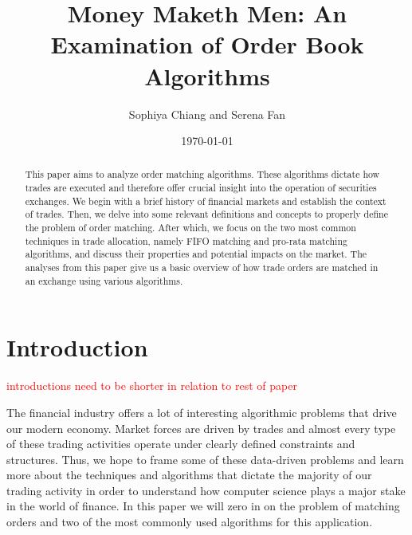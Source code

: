 \documentclass{article}
\newcommand{\todo}{\textcolor{red}}
\begin{document}
	
	\title{Money Maketh Men: An Examination of Order Book Algorithms}
	\author{Sophiya Chiang and Serena Fan}
	
\date{\today}

\maketitle

\begin{abstract}
This paper aims to analyze order matching algorithms. These algorithms dictate how trades are executed and therefore offer crucial insight into the operation of securities exchanges. We begin with a brief history of financial markets and establish the context of trades. Then, we delve into some relevant definitions and concepts to properly define the problem of order matching. After which, we focus on the two most common techniques in trade allocation, namely FIFO matching and pro-rata matching algorithms, and discuss their properties and potential impacts on the market. The analyses from this paper give us a basic overview of how trade orders are matched in an exchange using various algorithms.
\end{abstract}

\section{Introduction}
\todo{introductions need to be shorter in relation to rest of paper}

The financial industry offers a lot of interesting algorithmic problems that drive our modern economy. Market forces are driven by trades and almost every type of these trading activities operate under clearly defined constraints and structures. Thus, we hope to frame some of these data-driven problems and learn more about the techniques and algorithms that dictate the majority of our trading activity in order to understand how computer science plays a major stake in the world of finance. In this paper we will zero in on the problem of matching orders and two of the most commonly used algorithms for this application.
\end{document}
